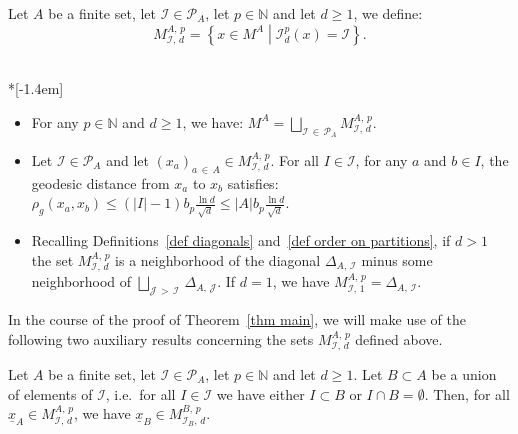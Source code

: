 \documentclass[AHL,Unicode,longabstracts,published]{cedram}
\newcommand{\I}{\mathcal{I}}
\newcommand{\J}{\mathcal{J}}
\newcommand{\pa}{\mathcal{P}\!}
\newcommand{\N}{\mathbb{N}}
\newcommand{\mvert}{\mathrel{}\middle|\mathrel{}}
\newcommand{\norm}[1]{\left\lvert #1 \right\rvert}
\renewcommand{\geq}{\geqslant}
\renewcommand{\leq}{\leqslant}
\begin{document}
\begin{defi}\label{def M AIdp}
Let $A$ be a finite set, let $\I \in \pa_A$, let $p \in \N$ and let $d \geq 1$, we define:
\[
M^{A,\,p}_{\I,\,d} = \left\{ x \in M^A \mvert \I^p_d(x) = \I \right\}.
\]
\end{defi}
\pagebreak
\begin{remas}\label{rem M AIdp}\ \\*[-1.4em]
\begin{itemize}
\item For any $p \in \N$ and $d \geq 1$, we have: $M^A = \bigsqcup_{\I\,\in\,\pa_A} M^{A,\,p}_{\I,\,d}$.
\item Let $\I \in \pa_A$ and let $(x_a)_{a\,\in\,A} \in M^{A,\,p}_{\I,\,d}$. For all $I \in \I$, for any $a$ and $b \in I$, the geodesic distance from $x_a$ to $x_b$ satisfies: $\rho_g(x_a,x_b) \leq (\norm{I}-1) b_p\tfrac{\ln d}{\sqrt{d}} \leq |A| b_p\tfrac{\ln d}{\sqrt{d}}$.
\item Recalling Definitions~\ref{def diagonals} and~\ref{def order on partitions}, if $d >1$ the set $M^{A,\,p}_{\I,\,d}$ is a neighborhood of the diagonal $\Delta_{A,\,\I}$ minus some neighborhood of $\bigsqcup_{\J\,>\,\I}\,\Delta_{A,\,\J}$. If $d=1$, we have $M^{A,\,p}_{\I,\,1}=\Delta_{A,\,\I}$.
\end{itemize}
\end{remas}

In the course of the proof of Theorem~\ref{thm main}, we will make use of the following two auxiliary results concerning the sets $M^{A,\,p}_{\I,\,d}$ defined above.

\begin{lemm}\label{lem M AIdp restricted}
Let $A$ be a finite set, let $\I \in \pa_A$, let $p \in \N$ and let $d \geq 1$. Let $B \subset A$ be a union of elements of $\I$, i.e.~for all $I \in \I$ we have either $I \subset B$ or $I \cap B = \emptyset$. Then, for all $\underline{x}_A \in M^{A,\,p}_{\I,\,d}$, we have $\underline{x}_B \in M^{B,\,p}_{\I_B,\,d}$.
\end{lemm}
\end{document}
